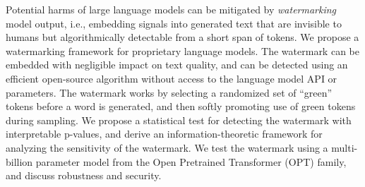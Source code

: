\documentclass{article}
\theoremstyle{plain}
\theoremstyle{definition}
\theoremstyle{remark}
\begin{document}




\renewenvironment{abstract}
 {
  \begin{center}
  \bfseries \abstractname\vspace{-.5em}\vspace{0pt}
  \end{center}
  \list{}{%
    \setlength{\leftmargin}{0mm}%
    \setlength{\rightmargin}{\leftmargin}%
  }%
  \item\relax}
 {\endlist}
\begin{abstract}
\vspace{-.2cm}
 Potential harms of large language models can be mitigated by {\em watermarking} model output, i.e., embedding signals into generated text that are invisible to humans but algorithmically detectable from a short span of tokens.  
We propose a watermarking framework for proprietary language models. The watermark can be embedded with negligible impact on text quality, and can be detected using an efficient open-source algorithm without access to the language model API or parameters.  The watermark works by selecting a randomized set of  ``green'' tokens before a word is generated, and then softly promoting use of green tokens during sampling.  
We propose a statistical test for detecting the watermark with interpretable p-values, and derive an information-theoretic framework for analyzing the sensitivity of the watermark. We test the watermark using a multi-billion parameter model from the Open Pretrained Transformer (OPT) family, and discuss robustness and security.
\end{abstract}
\vspace{-0.5cm}
\end{document}
